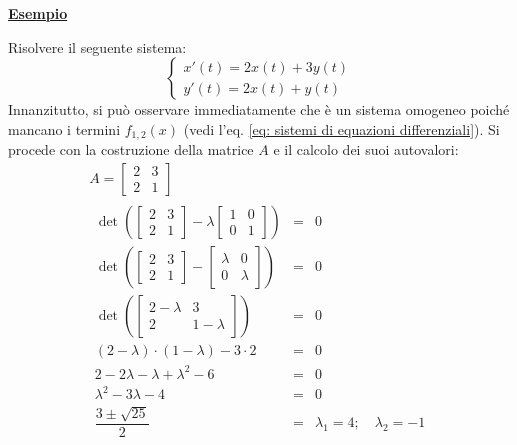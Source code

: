 \documentclass[a4paper]{article}
\newcommand{\example}[1]{\textcolor{Green4}{\textbf{#1}}}
\begin{document}
	\begin{flushleft}
		\example{\underline{Esempio}}
	\end{flushleft}

	\noindent
	Risolvere il seguente sistema:
	\begin{equation*}
		\begin{cases}
			x'\left(t\right) = 2x\left(t\right) + 3y\left(t\right) \\
			y'\left(t\right) = 2x\left(t\right) + y\left(t\right)
		\end{cases}
	\end{equation*}
	Innanzitutto, si può osservare immediatamente che è un sistema omogeneo poiché mancano i termini $f_{1,2}\left(x\right)$ (vedi l'eq. \ref{eq: sistemi di equazioni differenziali}). Si procede con la costruzione della matrice $A$ e il calcolo dei suoi autovalori:
	\begin{gather*}
		A = \begin{bmatrix}
			2 & 3 \\ 2 & 1
		\end{bmatrix} \\
		\begin{array}{rcl}
			\det\left(
				\begin{bmatrix}
					2 & 3 \\ 2 & 1
				\end{bmatrix}
				-
				\lambda
				\begin{bmatrix}
					1 & 0 \\ 0 & 1
				\end{bmatrix}
			\right) &=& 0 \\ [1.5em]
			\det\left(
				\begin{bmatrix}
					2 & 3 \\ 2 & 1
				\end{bmatrix}
				-
				\begin{bmatrix}
					\lambda & 0 \\ 0 & \lambda
				\end{bmatrix}
			\right) &=& 0 \\ [1.5em]
			\det\left(
				\begin{bmatrix}
					2-\lambda & 3 \\ 2 & 1-\lambda
				\end{bmatrix}
			\right) &=& 0 \\ [1.5em]
			\left(2-\lambda\right) \cdot \left(1-\lambda\right) - 3 \cdot 2 &=& 0 \\ [.5em]
			2 - 2\lambda - \lambda + \lambda^{2} - 6 &=& 0 \\ [.5em] 
			\lambda^{2} -3\lambda -4 &=& 0 \\ [1em]
			\dfrac{3 \pm \sqrt{25}}{2} &=& \lambda_{1} = 4; \hspace{1em} \lambda_{2} = -1
		\end{array}
	\end{gather*}
\end{document}
